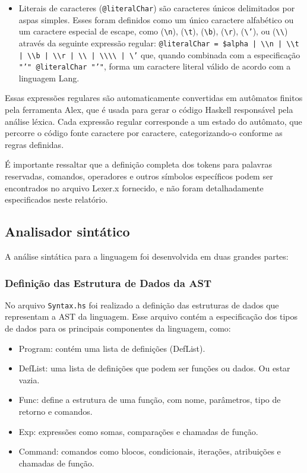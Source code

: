 \documentclass{article}
\begin{document}
\begin{itemize}
    \item Literais de caracteres (\texttt{@literalChar}) são caracteres únicos delimitados por aspas simples. Esses foram definidos como um único caractere alfabético ou um caractere especial de escape, como (\texttt{\textbackslash n}), (\texttt{\textbackslash t}), (\texttt{\textbackslash b}), (\texttt{\textbackslash r}), (\texttt{\textbackslash '}), ou (\texttt{\textbackslash\textbackslash}) através da seguinte expressão regular: \texttt{@literalChar = \$alpha | \textbackslash{}\textbackslash{}n | \textbackslash{}\textbackslash{}t | \textbackslash{}\textbackslash{}b | \textbackslash{}\textbackslash{}r | \textbackslash{}\textbackslash{} | \textbackslash{}\textbackslash{}\textbackslash{}\textbackslash{} | \textbackslash{}'} que, quando combinada com a especificação \texttt{"'" @literalChar "'"}, forma um caractere literal válido de acordo com a linguagem Lang.
\end{itemize}

Essas expressões regulares são automaticamente convertidas em autômatos finitos pela ferramenta Alex, que é usada para gerar o código Haskell responsável pela análise léxica. Cada expressão regular corresponde a um estado do autômato, que percorre o código fonte caractere por caractere, categorizando-o conforme as regras definidas.

É importante ressaltar que a definição completa dos tokens para palavras reservadas, comandos, operadores e outros símbolos específicos podem ser encontrados no arquivo Lexer.x fornecido, e não foram detalhadamente especificados neste relatório.


\subsection{Analisador sintático}\label{desenvolvimento:parser}
A análise sintática para a linguagem foi desenvolvida em duas grandes partes:

\subsubsection{Definição das Estrutura de Dados da AST}
No arquivo \texttt{Syntax.hs} foi realizado a definição das estruturas de dados que representam a AST da linguagem. Esse arquivo contém a especificação dos tipos de dados para os principais componentes da linguagem, como:

\begin{itemize}
    \item Program: contém uma lista de definições (DefList).
    \item DefList: uma lista de definições que podem ser funções ou dados. Ou estar vazia.
    \item Func: define a estrutura de uma função, com nome, parâmetros, tipo de retorno e comandos.
    \item Exp: expressões como somas, comparações e chamadas de função.
    \item Command: comandos como blocos, condicionais, iterações, atribuições e chamadas de função.
\end{itemize}
\end{document}
